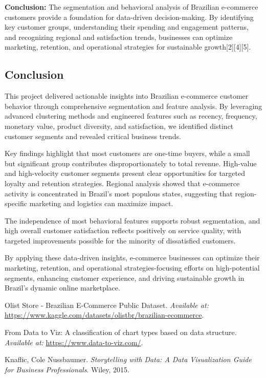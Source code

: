 \documentclass[a4paper]{article}
\begin{document}
\begin{multicols}{2}
\textbf{Conclusion:}  
The segmentation and behavioral analysis of Brazilian e-commerce customers provide a foundation for data-driven decision-making. By identifying key customer groups, understanding their spending and engagement patterns, and recognizing regional and satisfaction trends, businesses can optimize marketing, retention, and operational strategies for sustainable growth[2][4][5].


\subsection{Conclusion}

This project delivered actionable insights into Brazilian e-commerce customer behavior through comprehensive segmentation and feature analysis. By leveraging advanced clustering methods and engineered features such as recency, frequency, monetary value, product diversity, and satisfaction, we identified distinct customer segments and revealed critical business trends.

Key findings highlight that most customers are one-time buyers, while a small but significant group contributes disproportionately to total revenue. High-value and high-velocity customer segments present clear opportunities for targeted loyalty and retention strategies. Regional analysis showed that e-commerce activity is concentrated in Brazil’s most populous states, suggesting that region-specific marketing and logistics can maximize impact.

The independence of most behavioral features supports robust segmentation, and high overall customer satisfaction reflects positively on service quality, with targeted improvements possible for the minority of dissatisfied customers.

By applying these data-driven insights, e-commerce businesses can optimize their marketing, retention, and operational strategies-focusing efforts on high-potential segments, enhancing customer experience, and driving sustainable growth in Brazil’s dynamic online marketplace.



\begin{thebibliography}{9}

Olist Store - Brazilian E-Commerce Public Dataset. \textit{Available at:} \url{https://www.kaggle.com/datasets/olistbr/brazilian-ecommerce}.

From Data to Viz: A classification of chart types based on data structure. \textit{Available at:} \url{https://www.data-to-viz.com/}.

Knaflic, Cole Nussbaumer. \textit{Storytelling with Data: A Data Visualization Guide for Business Professionals}. Wiley, 2015.

\end{thebibliography}

\end{multicols}
\end{document}
